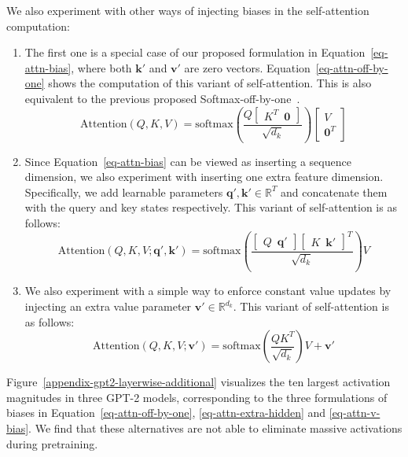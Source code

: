 \documentclass[10pt]{article}
\newcommand{\mbf}[1]{\mathbf{#1}}
\begin{document}
We also experiment with other ways of injecting biases in the self-attention computation: 
\begin{enumerate}[topsep=-2.pt,itemsep=-2.ex]%
\item The first one is a special case of our proposed formulation in Equation~\ref{eq-attn-bias}, where both $\mbf{k'}$ and $\mbf{v'}$ are zero vectors. Equation~\ref{eq-attn-off-by-one} shows the computation of this variant of self-attention. This is also equivalent to the previous proposed Softmax-off-by-one~\citep{miller2023attention}.
\begin{equation}\label{eq-attn-off-by-one}
    \text{Attention}(Q, K, V) = \text{softmax}\left(\frac{Q \begin{bmatrix}
        K^{T}\,\,\,\mbf{0}
    \end{bmatrix}}{\sqrt{d_k}}\right)\begin{bmatrix}
        V \\ 
        \mbf{0}^{T}   \end{bmatrix}
\end{equation}
\item Since Equation~\ref{eq-attn-bias} can be viewed as inserting a sequence dimension, we also experiment with inserting one extra feature dimension. Specifically, we add learnable parameters $\mbf{q'},\mbf{k'}\in\mathbb{R}^{T}$ and concatenate them with the query and key states respectively. This variant of self-attention is as follows:
\begin{equation}\label{eq-attn-extra-hidden}
    \text{Attention}(Q, K, V; \mbf{q'}, \mbf{k'}) = \text{softmax}\left(
    \frac{
    \begin{bmatrix}
    Q \,\,\, \mbf{q'}
    \end{bmatrix}
    \begin{bmatrix}
    K \,\,\, \mbf{k'}
    \end{bmatrix}^{T}
    }
    {\sqrt{d_k}}\right)V
\end{equation}
\item We also experiment with a simple way to enforce constant value updates by injecting an extra value parameter $\mbf{v'}\in\mathbb{R}^{d_{k}}$. This variant of self-attention is as follows:
\begin{equation}\label{eq-attn-v-bias}
    \text{Attention}(Q, K, V; \mbf{v'}) = \text{softmax}\left(
    \frac{
    Q
    K^{T} 
    }
    {\sqrt{d_k}}\right)V+\mbf{v'}
\end{equation}
\end{enumerate}
Figure~\ref{appendix-gpt2-layerwise-additional} visualizes the ten largest activation magnitudes in three GPT-2 models, corresponding to the three formulations of biases in Equation~\ref{eq-attn-off-by-one}, \ref{eq-attn-extra-hidden} and \ref{eq-attn-v-bias}. We find that these alternatives are not able to eliminate massive activations during pretraining.
\end{document}
